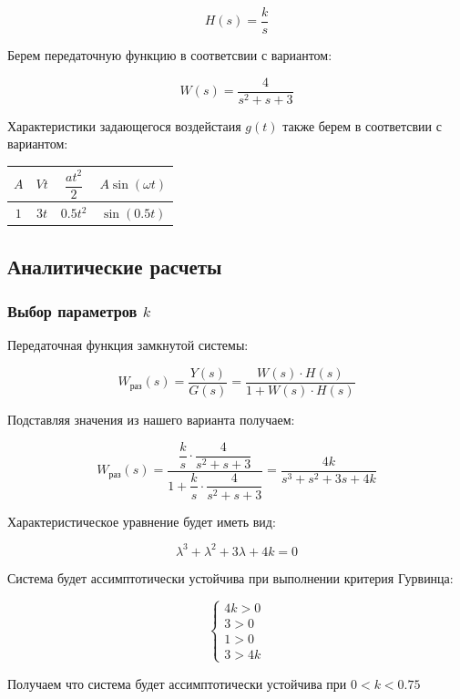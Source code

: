 \documentclass[a5paper, 10pt]{article}
\renewcommand{\arraystretch}{2} %
\theoremstyle{definition}
\theoremstyle{plain}
\theoremstyle{remark}
\begin{document}
$$
H(s)=\dfrac{k}{s}
$$

Берем передаточную функцию в соответсвии с вариантом:

$$
W(s)=\dfrac{4}{s^2+s+3}
$$

Характеристики задающегося воздейстаия $g(t)$ также берем в соответсвии с вариантом:

\begin{table}[H]
    \centering
    \renewcommand{\arraystretch}{2} %
    \begin{tabular}{|c|c|c|c|}
    \hline
        $A$ & $Vt$ & $\dfrac{at^2}{2}$ & $A\sin(\omega t)$ \\[3pt] \hline
        $1$ & $3t$ & $0.5t^2$ & $\sin(0.5t)$ \\ \hline
    \end{tabular}
    \label{tab:placeholder}
\end{table}

\subsection{Аналитические расчеты}

\subsubsection{Выбор параметров $k$}

Передаточная функция замкнутой системы:

$$
W_{\text{раз}}(s)=\dfrac{Y(s)}{G(s)}= \dfrac{W(s)\cdot H(s)}{1+W(s)\cdot H(s)}
$$

Подставляя значения из нашего варианта получаем:

$$
W_{\text{раз}}(s)=\dfrac{\dfrac{k}{s}\cdot \dfrac{4}{s^2+s+3}}{1+\dfrac{k}{s}\cdot \dfrac{4}{s^2+s+3}}=\dfrac{4k}{s^3+s^2+3s+4k}
$$

Характеристическое уравнение будет иметь вид:

$$
\lambda^3+\lambda^2+3\lambda+4k=0
$$

Система будет ассимптотически устойчива при выполнении критерия Гурвинца:

$$
\begin{cases}
    4k>0\\
    3>0\\
    1>0\\
    3>4k
\end{cases}
$$

Получаем что система будет ассимптотически устойчива при $0<k<0.75$
\end{document}
